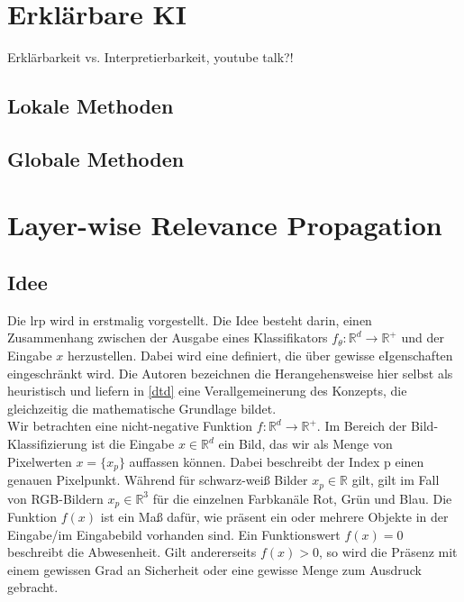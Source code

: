 \documentclass[twoside, 12pt,a4paper]{article}
\numberwithin{equation}{section}
\begin{document}
	\section{Erklärbare KI} \label{chapter_xai}
	
	Erklärbarkeit vs. Interpretierbarkeit, youtube talk?!
	
	\subsection{Lokale Methoden}
	
	\subsection{Globale Methoden}
	
	\section{Layer-wise Relevance Propagation} \label{chapter_lrp}
	\subsection{Idee}
	
	Die \gls{lrp} wird in \cite{LRP_first_paper} erstmalig vorgestellt. Die Idee besteht darin, einen Zusammenhang zwischen der Ausgabe eines Klassifikators $f_{\theta}: \mathbb{R}^d\to \mathbb{R^{+}}$ und der Eingabe $x$ herzustellen. Dabei wird eine definiert, die über gewisse eIgenschaften eingeschränkt wird. Die Autoren bezeichnen die Herangehensweise hier selbst als heuristisch und liefern in \ref{dtd} eine Verallgemeinerung des Konzepts, die gleichzeitig die mathematische Grundlage bildet.\\
	
	Wir betrachten eine nicht-negative Funktion $f: \mathbb{R}^d \to \mathbb{R}^{+}$. Im Bereich der Bild-Klassifizierung ist die Eingabe $x \in \mathbb{R}^d$ ein Bild, das wir als Menge von Pixelwerten $x=\lbrace x_p \rbrace$ auffassen können. Dabei beschreibt der Index p einen genauen Pixelpunkt. Während für schwarz-weiß Bilder $x_p \in \mathbb{R}$ gilt, gilt im Fall von RGB-Bildern $x_p \in \mathbb{R}^3$ für die einzelnen Farbkanäle Rot, Grün und Blau. Die Funktion $f(x)$ ist ein Maß dafür, wie präsent ein oder mehrere Objekte in der Eingabe/im Eingabebild vorhanden sind. Ein Funktionswert $f(x)=0$ beschreibt die Abwesenheit. Gilt andererseits $f(x) >0$, so wird die Präsenz mit einem gewissen Grad an Sicherheit oder eine gewisse Menge zum Ausdruck gebracht.\\
	
\end{document}
